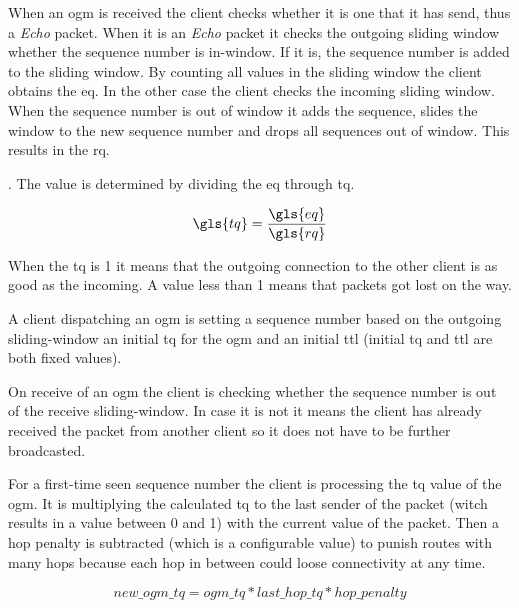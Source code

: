 When an \gls{ogm} is received the client checks whether it is one that it has send, thus a \textit{Echo} packet. When it is an \textit{Echo} packet it checks the outgoing sliding window whether the sequence number is in-window. If it is, the sequence number is added to the sliding window. By counting all values in the sliding window the client obtains the \gls{eq}. 
In the other case the client checks the incoming sliding window. When the sequence number is out of window it adds the sequence, slides the window to the new sequence number and drops all sequences out of window. This results in the \gls{rq}.

\citet[\S2.3.3]{tobias_hardes}. The value is determined by dividing the \gls{eq} through \gls{tq}.

\begin{equation}
\label{eq:transmit_quality}
\gls{tq} = \frac{\gls{eq}}{\gls{rq}}
\end{equation}

When the \gls{tq} is 1 it means that the outgoing connection to the other client is as good as the incoming. A value less than 1 means that packets got lost on the way.

A client dispatching an \gls{ogm} is setting a sequence number based on the outgoing sliding-window an initial \gls{tq} for the \gls{ogm} and an initial \gls{ttl} (initial \gls{tq} and \gls{ttl} are both fixed values). 

On receive of an \gls{ogm} the client is checking whether the sequence number is out of the receive sliding-window. In case it is not it means the client has already received the packet from another client so it does not have to be further broadcasted.

For a first-time seen sequence number the client is processing the \gls{tq} value of the \gls{ogm}. It is multiplying the calculated \gls{tq} to the last sender of the packet (witch results in a value between 0 and 1) with the current value of the packet. Then a hop penalty is subtracted (which is a configurable value) to punish routes with many hops because each hop in between could loose connectivity at any time.

\begin{equation}
\label{eq:ogm_quality}
new\_ogm\_tq = ogm\_tq * last\_hop\_tq * hop\_penalty
\end{equation}

